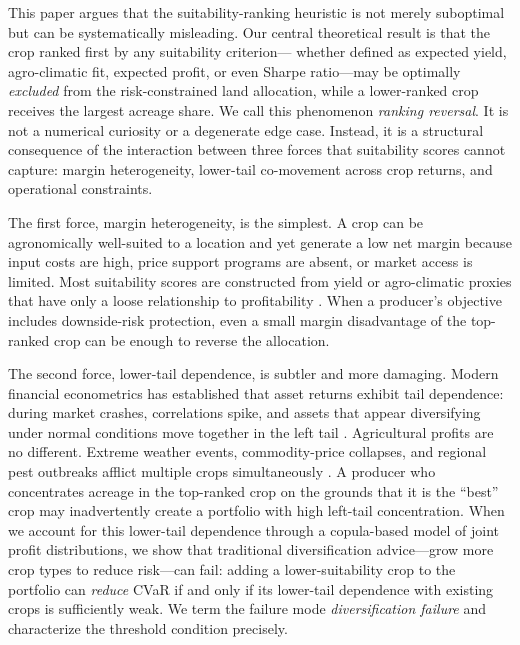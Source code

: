 \documentclass[12pt,review,authoryear]{elsarticle}
\numberwithin{equation}{section}
\begin{document}
This paper argues that the suitability-ranking heuristic is not merely
suboptimal but can be systematically misleading.  Our central theoretical
result is that the crop ranked first by any suitability criterion---
whether defined as expected yield, agro-climatic fit, expected profit, or
even Sharpe ratio---may be optimally \emph{excluded} from the
risk-constrained land allocation, while a lower-ranked crop receives the
largest acreage share.  We call this phenomenon \emph{ranking reversal}.
It is not a numerical curiosity or a degenerate edge case.  Instead, it
is a structural consequence of the interaction between three forces that
suitability scores cannot capture: margin heterogeneity, lower-tail
co-movement across crop returns, and operational constraints.

The first force, margin heterogeneity, is the simplest.  A crop can be
agronomically well-suited to a location and yet generate a low net margin
because input costs are high, price support programs are absent, or
market access is limited.  Most suitability scores are constructed from
yield or agro-climatic proxies that have only a loose relationship to
profitability \citep{Lobell2009}.  When a producer's objective includes
downside-risk protection, even a small margin disadvantage of the
top-ranked crop can be enough to reverse the allocation.

The second force, lower-tail dependence, is subtler and more damaging.
Modern financial econometrics has established that asset returns exhibit
tail dependence: during market crashes, correlations spike, and assets
that appear diversifying under normal conditions move together in the
left tail \citep{Longin2001,Ang2002}.  Agricultural profits are no
different.  Extreme weather events, commodity-price collapses, and
regional pest outbreaks afflict multiple crops simultaneously
\citep{Barnett2008,Barnhill2022}.  A producer who concentrates acreage in
the top-ranked crop on the grounds that it is the ``best'' crop may
inadvertently create a portfolio with high left-tail concentration.
When we account for this lower-tail dependence through a copula-based
model of joint profit distributions, we show that traditional
diversification advice---grow more crop types to reduce risk---can fail:
adding a lower-suitability crop to the portfolio can \emph{reduce} CVaR
if and only if its lower-tail dependence with existing crops is
sufficiently weak.  We term the failure mode \emph{diversification
failure} and characterize the threshold condition precisely.
\end{document}
